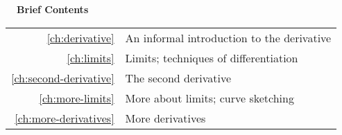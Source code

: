 \documentclass{fund}
\begin{document}
%

\cleardoublepage





\pagebreak\vspace{100mm}

\hbox{}\noindent\huge\bfseries\sffamily{}\hspace{-2mm}\ \ Brief Contents\\
\hspace{-20mm}\noindent\mynormaltype\Large\sffamily{}\begin{tabular}{rl}
\ref{ch:derivative} & An informal introduction to the derivative \quad \pageref{ch:derivative}\\
\ref{ch:limits} &  Limits; techniques of differentiation \quad \pageref{ch:limits}\\
\ref{ch:second-derivative} & The second derivative \quad \pageref{ch:second-derivative}\\
\ref{ch:more-limits} & More about limits; curve sketching\quad \pageref{ch:more-limits}\\
\ref{ch:more-derivatives} & More derivatives\quad \pageref{ch:more-derivatives}\\
\end{tabular}
\mynormaltype

\vspace{100mm}\pagebreak

\cleardoublepage

\mynormaltype

\tableofcontents

\mainmatter
  \addtocounter{page}{6} 
\parafmt
\myeqnspacing %
	\renewcommand{\chapdir}{ch01}
	\renewcommand{\chapdir}{ch02}
	\renewcommand{\chapdir}{ch03}
	\renewcommand{\chapdir}{ch04}
	\formatchtoc{\large}{\quad\contentspage}{4mm} %
	\renewcommand{\chapdir}{ch05}

\end{document}
